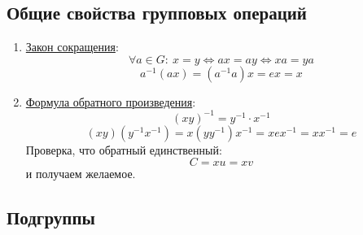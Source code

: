 



\subsection{Общие свойства групповых операций}

\begin{enumerate}
    \item \ul{Закон сокращения}:
    \[\forall a \in G: \  x = y \Leftrightarrow ax = ay \Leftrightarrow xa = ya\]
    \[a^{-1}(ax) = (a^{-1}a)x = ex = x\]

    \item \ul{Формула обратного произведения}:
    \[(xy)^{-1} = y ^ {-1} \cdot x ^{-1}\]
    \[(xy)(y^{-1}x^{-1}) = x(y y^{-1}) x^ {-1} = xex^{-1} = x x^{-1} = e\]
    Проверка, что обратный единственный: \\
    \[C = x u = xv\] и получаем желаемое.
\end{enumerate}



\subsection{Подгруппы}

